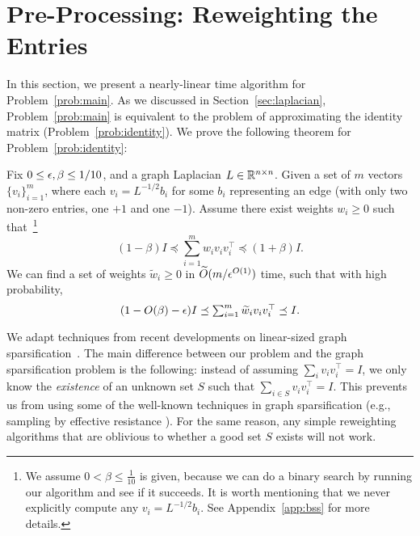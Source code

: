 
\section{Pre-Processing: Reweighting the Entries}
\label{sec:bss}

In this section, we present a nearly-linear time algorithm for Problem~\ref{prob:main}.
As we discussed in Section~\ref{sec:laplacian}, Problem~\ref{prob:main} is equivalent to the problem of approximating the identity matrix (Problem~\ref{prob:identity}). We prove the following theorem for Problem~\ref{prob:identity}:

\begin{theorem}
\label{thm:bss}
Fix $0 \le \epsilon, \beta \le 1/10$, and a graph Laplacian $L \in \mathbb{R}^{n \times n}$.
Given a set of $m$ vectors $\{v_i\}_{i=1}^m$, where each $v_i = L^{-1/2} b_i$ for some $b_i$ representing an edge (with only two non-zero entries, one $+1$ and one $-1$).
Assume there exist weights $w_i \ge 0$ such that~\footnote{We assume $0<\beta\le\frac{1}{10}$ is given, because we can do a binary search by running our algorithm and see if it succeeds.
It is worth mentioning that we never explicitly compute any $v_i = L^{-1/2} b_i$. %
See Appendix~\ref{app:bss} for more details.}
\[
\textstyle (1-\beta) I \preceq \sum_{i=1}^m w_i v_i v_i^\top \preceq (1+\beta) I.
\]
We can find a set of weights $\tilde w_i \ge 0$ in $\widetilde O(m / \epsilon^{O(1)})$ time, such that with high probability,
\[
\textstyle (1-O(\beta)-\epsilon)I \preceq \sum_{i=1}^m \widetilde w_i v_i v_i^\top \preceq I.
\]
\end{theorem}

We adapt techniques from recent developments on linear-sized graph sparsification~\citep{BatsonSS12, AllenLO15, LeeS17}.
The main difference between our problem and the graph sparsification problem is the following: instead of assuming $\sum_i v_i v_i^\top = I$, we only know the \emph{existence} of an unknown set $S$ such that \mbox{$\sum_{i\in S} v_i v_i^\top = I$}.
This prevents us from using some of the well-known techniques in graph sparsification (e.g., sampling by effective resistance \cite{SpielmanS11, LeeS15}).
For the same reason, any simple reweighting algorithms that are oblivious to whether a good set $S$ exists will not work.

